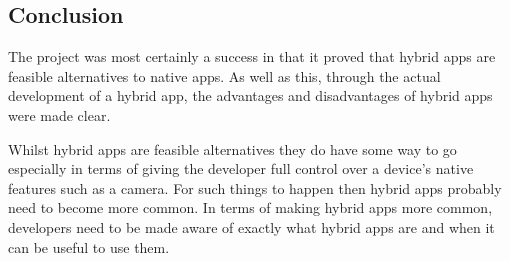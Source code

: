 \subsection{Conclusion}
The project was most certainly a success in that it proved that hybrid apps are feasible alternatives to native apps. As well as this, through the actual development of a hybrid app, the advantages and disadvantages of hybrid apps were made clear.

Whilst hybrid apps are feasible alternatives they do have some way to go especially in terms of giving the developer full control over a device's native features such as a camera. For such things to happen then hybrid apps probably need to become more common. In terms of making hybrid apps more common, developers need to be made aware of exactly what hybrid apps are and when it can be useful to use them. 
